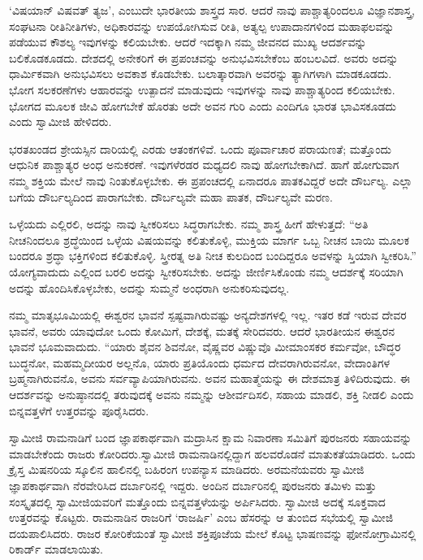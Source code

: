  ‘ವಿಷಯಾನ್ ವಿಷವತ್ ತ್ಯಜ’, ಎಂಬುದೇ ಭಾರತೀಯ ಶಾಸ್ತ್ರದ ಸಾರ. ಆದರೆ ನಾವು ಪಾಶ್ಚಾತ್ಯರಿಂದಲೂ ವಿಜ್ಞಾನಶಾಸ್ತ್ರ, ಸಂಘಟನಾ ರೀತಿನೀತಿಗಳು, ಅಧಿಕಾರವನ್ನು ಉಪಯೋಗಿಸುವ ರೀತಿ, ಅತ್ಯಲ್ಪ ಉಪಾದಾನಗಳಿಂದ ಮಹಾಫಲವನ್ನು ಪಡೆಯುವ ಕೌಶಲ್ಯ ಇವುಗಳನ್ನು ಕಲಿಯಬೇಕು. ಆದರೆ ಇದಕ್ಕಾಗಿ ನಮ್ಮ ಜೀವನದ ಮುಖ್ಯ ಆದರ್ಶವನ್ನು ಬಲಿಕೊಡಕೂಡದು. ದೇಶದಲ್ಲಿ ಅನೇಕರಿಗೆ ಈ ಪ್ರಪಂಚವನ್ನು ಅನುಭವಿಸಬೇಕೆಂಬ ಹಂಬಲವಿದೆ. ಅವರು ಅದನ್ನು ಧಾರ್ಮಿಕವಾಗಿ ಅನುಭವಿಸಲು ಅವಕಾಶ ಕೊಡಬೇಕು. ಬಲಾತ್ಕಾರವಾಗಿ ಅವರನ್ನು ತ್ಯಾಗಿಗಳಾಗಿ ಮಾಡಕೂಡದು. ಭೋಗ ಸಲಕರಣೆಗಳು ಆಹಾರವನ್ನು ಉತ್ಪಾದನೆ ಮಾಡುವುದು ಇವುಗಳನ್ನು ನಾವು ಪಾಶ್ಚಾತ್ಯರಿಂದ ಕಲಿಯಬೇಕು. ಭೋಗದ ಮೂಲಕ ಜೀವಿ ಹೋಗಬೇಕೆ ಹೊರತು ಅದೇ ಅವನ ಗುರಿ ಎಂದು ಎಂದಿಗೂ ಭಾರತ ಭಾವಿಸಕೂಡದು ಎಂದು ಸ್ವಾಮೀಜಿ ಹೇಳಿದರು. 

 ಭರತಖಂಡದ ಶ್ರೇಯಸ್ಸಿನ ದಾರಿಯಲ್ಲಿ ಎರಡು ಆತಂಕಗಳಿವೆ. ಒಂದು ಪೂರ್ವಾಚಾರ ಪರಾಯಣತೆ; ಮತ್ತೊಂದು ಆಧುನಿಕ ಪಾಶ್ಚಾತ್ಯರ ಅಂಧ ಅನುಕರಣೆ. ಇವುಗಳೆರಡರ ಮಧ್ಯದಲಿ ನಾವು ಹೋಗಬೇಕಾಗಿದೆ. ಹಾಗೆ ಹೋಗುವಾಗ ನಮ್ಮ ಶಕ್ತಿಯ ಮೇಲೆ ನಾವು ನಿಂತುಕೊಳ್ಳಬೇಕು. ಈ ಪ್ರಪಂಚದಲ್ಲಿ ಏನಾದರೂ ಪಾತಕವಿದ್ದರೆ ಅದೇ ದೌರ್ಬಲ್ಯ. ಎಲ್ಲಾ ಬಗೆಯ ದೌರ್ಬಲ್ಯದಿಂದ ಪಾರಾಗಬೇಕು. ದೌರ್ಬಲ್ಯವೇ ಮಹಾ ಪಾತಕ, ದೌರ್ಬಲ್ಯವೇ ಮರಣ. 

 ಒಳ್ಳೆಯದು ಎಲ್ಲಿರಲಿ, ಅದನ್ನು ನಾವು ಸ್ವೀಕರಿಸಲು ಸಿದ್ಧರಾಗಬೇಕು. ನಮ್ಮ ಶಾಸ್ತ್ರ ಹೀಗೆ ಹೇಳುತ್ತದೆ: “ಅತಿ ನೀಚನಿಂದಲೂ ಶ್ರದ್ಧೆಯಿಂದ ಒಳ್ಳೆಯ ವಿಷಯವನ್ನು ಕಲಿತುಕೊಳ್ಳಿ, ಮುಕ್ತಿಯ ಮಾರ್ಗ ಒಬ್ಬ ನೀಚನ ಬಾಯಿ ಮೂಲಕ ಬಂದರೂ ಶ್ರದ್ಧಾ ಭಕ್ತಿಗಳಿಂದ ಕಲಿತುಕೊಳ್ಳಿ. ಸ್ತ್ರೀರತ್ನ ಅತಿ ನೀಚ ಕುಲದಿಂದ ಬಂದಿದ್ದರೂ ಅವಳನ್ನು ಸ್ತಿಯಾಗಿ ಸ್ವೀಕರಿಸಿ.” ಯೋಗ್ಯವಾದುದು ಎಲ್ಲಿಂದ ಬರಲಿ ಅದನ್ನು ಸ್ವೀಕರಿಸಬೇಕು. ಅದನ್ನು ಜೀರ್ಣಿಸಿಕೊಂಡು ನಮ್ಮ ಆದರ್ಶಕ್ಕೆ ಸರಿಯಾಗಿ ಅದನ್ನು ಹೊಂದಿಸಿಕೊಳ್ಳಬೇಕು, ಅದನ್ನು ಸುಮ್ಮನೆ ಅಂಧರಾಗಿ ಅನುಕರಿಸುವುದಲ್ಲ. 

 ನಮ್ಮ ಮಾತೃಭೂಮಿಯಲ್ಲಿ ಈಶ್ವರನ ಭಾವನೆ ಸ್ಪಷ್ಟವಾಗಿರುವಷ್ಟು ಅನ್ಯದೇಶಗಳಲ್ಲಿ ಇಲ್ಲ. ಇತರ ಕಡೆ ಇರುವ ದೇವರ ಭಾವನೆ, ಅವರು ಯಾವುದೋ ಒಂದು ಕೋಮಿಗೆ, ದೇಶಕ್ಕೆ, ಮತಕ್ಕೆ ಸೇರಿದವರು. ಆದರೆ ಭಾರತೀಯನ ಈಶ್ವರನ ಭಾವನೆ ಭೂಮವಾದುದು. “ಯಾರು ಶೈವನ ಶಿವನೋ, ವೈಷ್ಣವರ ವಿಷ್ಣುವೊ ಮೀಮಾಂಸಕರ ಕರ್ಮವೋ, ಬೌದ್ಧರ ಬುದ್ಧನೋ, ಮಹಮ್ಮದೀಯರ ಅಲ್ಲನೊ, ಯಾರು ಪ್ರತಿಯೊಂದು ಧರ್ಮದ ದೇವರಾಗಿರುವನೋ, ವೇದಾಂತಿಗಳ ಬ್ರಹ್ಮನಾಗಿರುವನೊ, ಅವನು ಸರ್ವವ್ಯಾಪಿಯಾಗಿರುವನು. ಅವನ ಮಹಾತ್ಮೆಯನ್ನು ಈ ದೇಶಮಾತ್ರ ತಿಳಿದಿರುವುದು. ಈ ಆದರ್ಶವನ್ನು ಅನುಷ್ಠಾನದಲ್ಲಿ ತರುವುದಕ್ಕೆ ಅವನು ನಮ್ಮನ್ನು ಆಶೀರ್ವದಿಸಲಿ, ಸಹಾಯ ಮಾಡಲಿ, ಶಕ್ತಿ ನೀಡಲಿ ಎಂದು ಬಿನ್ನವತ್ತಳೆಗೆ ಉತ್ತರವನ್ನು ಪೂರೈಸಿದರು. 

 ಸ್ವಾಮೀಜಿ ರಾಮನಾಡಿಗೆ ಬಂದ ಜ್ಞಾಪಕಾರ್ಥವಾಗಿ ಮದ್ರಾಸಿನ ಕ್ಷಾಮ ನಿವಾರಣಾ ಸಮಿತಿಗೆ ಪುರಜನರು ಸಹಾಯವನ್ನು ಮಾಡಬೇಕೆಂದು ರಾಜರು ಕೋರಿದರು.\break ಸ್ವಾಮೀಜಿ ರಾಮನಾಡಿನಲ್ಲಿದ್ದಾಗ ಹಲವರೊಡನೆ ಮಾತುಕತೆಯಾಡಿದರು. ಒಂದು ಕ್ರೈಸ್ತ ಮಿಷನರಿಯ ಸ್ಕೂಲಿನ ಹಾಲಿನಲ್ಲಿ ಬಹಿರಂಗ ಉಪನ್ಯಾಸ ಮಾಡಿದರು. ಅರಮನೆಯವರು ಸ್ವಾಮೀಜಿ ಜ್ಞಾಪಕಾರ್ಥವಾಗಿ ನೆರವೇರಿಸಿದ ದರ್ಬಾರಿನಲ್ಲಿ ಇದ್ದರು. ಅಂದಿನ ದರ್ಬಾರಿನಲ್ಲಿ ಪುರಜನರು ತಮಿಳು ಮತ್ತು ಸಂಸ್ಕೃತದಲ್ಲಿ ಸ್ವಾಮೀಜಿಯವರಿಗೆ ಮತ್ತೊಂದು ಬಿನ್ನವತ್ತಳೆಯನ್ನು ಅರ್ಪಿಸಿದರು. ಸ್ವಾಮೀಜಿ ಅದಕ್ಕೆ ಸೂಕ್ತವಾದ ಉತ್ತರವನ್ನು ಕೊಟ್ಟರು. ರಾಮನಾಡಿನ ರಾಜರಿಗೆ ‘ರಾಜರ್ಷಿ’ ಎಂಬ ಹೆಸರನ್ನು ಆ ತುಂಬಿದ ಸಭೆಯಲ್ಲಿ ಸ್ವಾಮೀಜಿ ದಯಪಾಲಿಸಿದರು. ರಾಜರ ಕೋರಿಕೆಯಂತೆ ಸ್ವಾಮೀಜಿ ಶಕ್ತಿಪೂಜೆಯ ಮೇಲೆ ಕೊಟ್ಟ ಭಾಷಣವನ್ನು ಫೋನೋಗ್ರಾಮಿನಲ್ಲಿ ರಿಕಾರ್ಡ್ ಮಾಡಲಾಯಿತು. 

